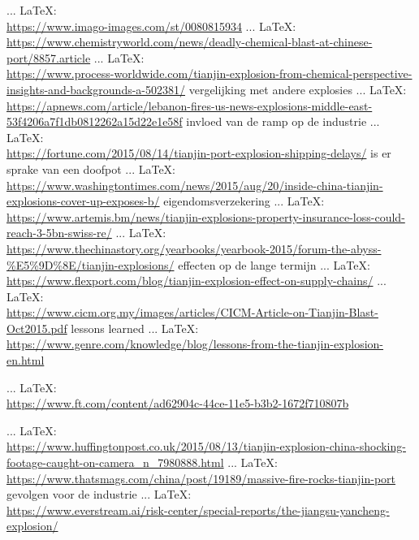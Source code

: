 \begin{thebibliography}{99}
{{{     ... \LaTeX:\\ \url{https://www.imago-images.com/st/0080815934}
     ... \LaTeX:\\ \url{https://www.chemistryworld.com/news/deadly-chemical-blast-at-chinese-port/8857.article}
     ... \LaTeX:\\ \url{https://www.process-worldwide.com/tianjin-explosion-from-chemical-perspective-insights-and-backgrounds-a-502381/}
    vergelijking met andere explosies
     ... \LaTeX:\\ \url{https://apnews.com/article/lebanon-fires-us-news-explosions-middle-east-53f4206a7f1db0812262a15d22e1e58f}
    invloed van de ramp op de industrie
     ... \LaTeX:\\ \url{https://fortune.com/2015/08/14/tianjin-port-explosion-shipping-delays/}
    is er sprake van een doofpot
     ... \LaTeX:\\ \url{https://www.washingtontimes.com/news/2015/aug/20/inside-china-tianjin-explosions-cover-up-exposes-b/}
    eigendomsverzekering
     ... \LaTeX:\\ \url{https://www.artemis.bm/news/tianjin-explosions-property-insurance-loss-could-reach-3-5bn-swiss-re/}
     ... \LaTeX:\\ \url{https://www.thechinastory.org/yearbooks/yearbook-2015/forum-the-abyss-%E5%9D%8E/tianjin-explosions/}
    effecten op de lange termijn
     ... \LaTeX:\\ \url{https://www.flexport.com/blog/tianjin-explosion-effect-on-supply-chains/}
     ... \LaTeX:\\ \url{https://www.cicm.org.my/images/articles/CICM-Article-on-Tianjin-Blast-Oct2015.pdf}
    lessons learned
     ... \LaTeX:\\ \url{https://www.genre.com/knowledge/blog/lessons-from-the-tianjin-explosion-en.html}

     ... \LaTeX:\\ \url{https://www.ft.com/content/ad62904c-44ce-11e5-b3b2-1672f710807b}

     ... \LaTeX:\\ \url{https://www.huffingtonpost.co.uk/2015/08/13/tianjin-explosion-china-shocking-footage-caught-on-camera_n_7980888.html}
     ... \LaTeX:\\ \url{https://www.thatsmags.com/china/post/19189/massive-fire-rocks-tianjin-port}
    gevolgen voor de industrie
     ... \LaTeX:\\ \url{https://www.everstream.ai/risk-center/special-reports/the-jiangsu-yancheng-explosion/}

}}}
\end{thebibliography}

